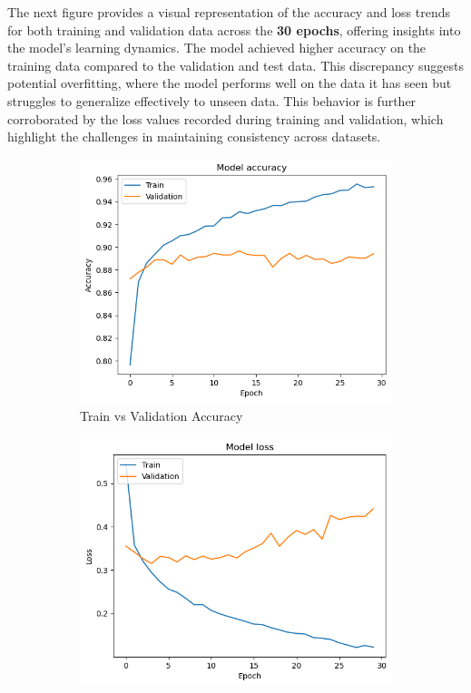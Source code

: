 The next figure provides a visual representation of the accuracy and loss trends for both training and validation data across the \textbf{30 epochs}, offering insights into the model's learning dynamics.
The model achieved higher accuracy on the training data compared to the validation and test data. This discrepancy suggests potential overfitting, where the model performs well on the data it has seen but struggles to generalize effectively to unseen data.
This behavior is further corroborated by the loss values recorded during training and validation, which highlight the challenges in maintaining consistency across datasets.

\begin{figure}[H]
    \centering
    \begin{subfigure}[t]{0.45\textwidth} 
        \centering
        \includegraphics[width=\textwidth]{images/densenet_accuracy.png}
        \caption{Train vs Validation Accuracy}
        \label{fig:subfig1}
    \end{subfigure}
    \hfill
    \begin{subfigure}[t]{0.45\textwidth}
        \centering
        \includegraphics[width=\textwidth]{images/densenet_loss.png}

\end{subfigure}
\end{figure}
